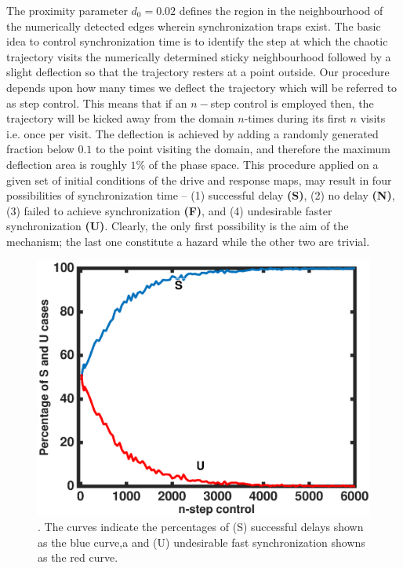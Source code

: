 \documentclass[preprint,showpacs,preprintnumbers,amsmath,amssymb]{revtex4-1}
\begin{document}
The proximity parameter $d_0 = 0.02$ defines the region in the neighbourhood of the numerically detected edges wherein synchronization traps exist. The basic idea to control synchronization time is to identify the step at which the chaotic trajectory visits the numerically determined sticky neighbourhood followed by a slight deflection so that the trajectory resters at a point outside.  Our procedure depends upon how many times we deflect the trajectory  which will be referred to as step control. This means that if an $n-$step control is  employed then, the trajectory will be kicked away from the domain $n$-times during its first $n$ visits i.e. once per visit. The deflection is achieved by adding a randomly generated fraction below $0.1$ to the point visiting the domain, and therefore the maximum deflection area is roughly $1\%$ of the phase space.  This procedure applied on a given set of initial conditions of the drive and response maps, may result in four possibilities of synchronization time -- (1) successful delay  \textbf{(S)}, (2) no delay \textbf{(N)}, (3) failed to achieve synchronization \textbf{(F)}, and (4) undesirable faster synchronization \textbf{(U)}. Clearly, the only first possibility is the aim of the mechanism; the last one constitute a hazard while the other two are trivial. 
\begin{figure}[h]
\includegraphics[scale=0.6]{S_U_Percent}
\caption{\label{fig:Control_success} \footnotesize. The curves indicate the 
percentages of (S) successful delays shown as the blue curve,a and (U) 
undesirable fast synchronization showns as the red curve. }
\end{figure}
\end{document}

